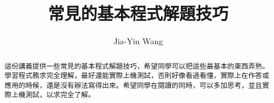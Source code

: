 \documentclass[12pt,a4paper]{article}
\begin{document}
\title{常見的基本程式解題技巧}
\author{Jia-Yin Wang}
\maketitle

\begin{abstract}
這份講義提供一些常見的基本程式解題技巧，希望同學可以把這些最基本的東西弄熟。
學習程式務求完全理解，最好還能實際上機測試，否則好像看過看懂，實際上在作答或應用的時候，還是沒有辦法寫得出來。希望同學在閱讀的同時，可以多加思考，並且實際上機測試，以求完全了解。
\end{abstract}


\end{document}
